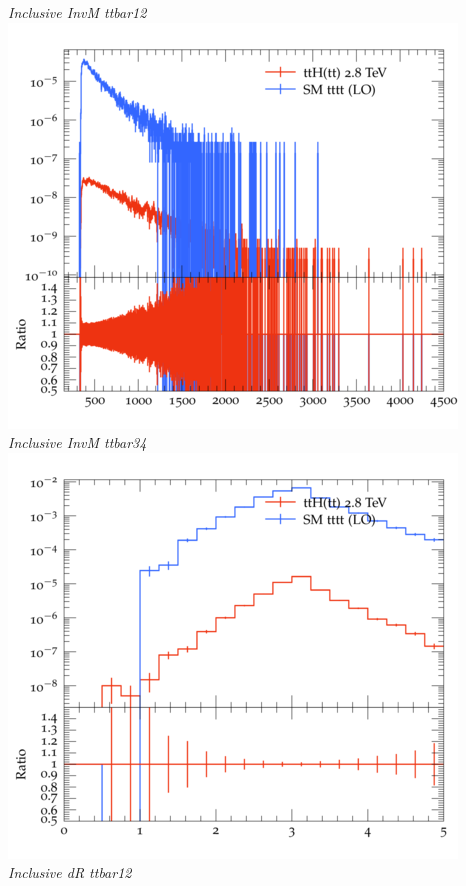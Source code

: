 \documentclass{beamer}
\begin{document}
\begin{frame}
\begin{columns}
\textit{\small Inclusive InvM ttbar12}
\includegraphics[width=\textwidth]{../plots/ttH_2800/tttt_ttH/Inclusive_InvM_ttbar34.png}\\
\textit{\small Inclusive InvM ttbar34}
\includegraphics[width=\textwidth]{../plots/ttH_2800/tttt_ttH/Inclusive_dR_ttbar12.png}\\
\textit{\small Inclusive dR ttbar12}
\end{columns}
\end{frame}
\end{document}
